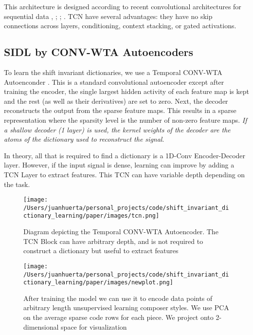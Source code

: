 \documentclass[11pt,a4paper]{article}
\begin{document}
This architecture is designed according to recent convolutional architectures for sequential data \cite{oord2016wavenet},
\cite{kalchbrenner2017neural} ; \cite{DBLP:journals/corr/DauphinFAG16}; \cite{Zheng2016}. TCN have several advantages: they have no skip connections across layers, conditioning, context stacking, or gated activations.


\subsection{SIDL by CONV-WTA Autoencoders}
To learn the shift invariant dictionaries, we use a Temporal CONV-WTA Autoenconder \cite{DBLP:journals/corr/MakhzaniF14}. This is a standard convolutional autoencoder except after training the encoder, the single largest hidden activity of each feature map is kept and the rest (as well as their derivatives) are set to zero. Next, the decoder reconstructs the output from the sparse feature maps. This results in a sparse representation where the sparsity level is the number of non-zero feature maps. \emph{If a shallow decoder (1 layer) is used, the kernel weights of the decoder are the atoms of the dictionary used to reconstruct the signal}. 

In theory, all that is required to find a dictionary is a 1D-Conv Encoder-Decoder layer. However, if the input signal is dense, learning can improve by adding a TCN Layer to extract features. This TCN can have variable depth depending on the task.

\begin{figure}[ht]
  \texttt{[image: /Users/juanhuerta/personal\_projects/code/shift\_invariant\_dictionary\_learning/paper/images/tcn.png]}
  \caption{Diagram depicting the Temporal CONV-WTA Autoencoder. The TCN Block can have arbitrary depth, and is not required to construct a dictionary but useful to extract features}
  \label{fig:bt1}
\end{figure}

\begin{figure*}[ht]
  \texttt{[image: /Users/juanhuerta/personal\_projects/code/shift\_invariant\_dictionary\_learning/paper/images/newplot.png]}
  \caption{After training the model we can use it to encode data points of arbitrary length unsupervised learning composer styles. We use PCA on the average sparse code rows for each piece. We project onto 2-dimensional space for visualization }
    \label{fig:b4}
\end{figure*}
\end{document}
